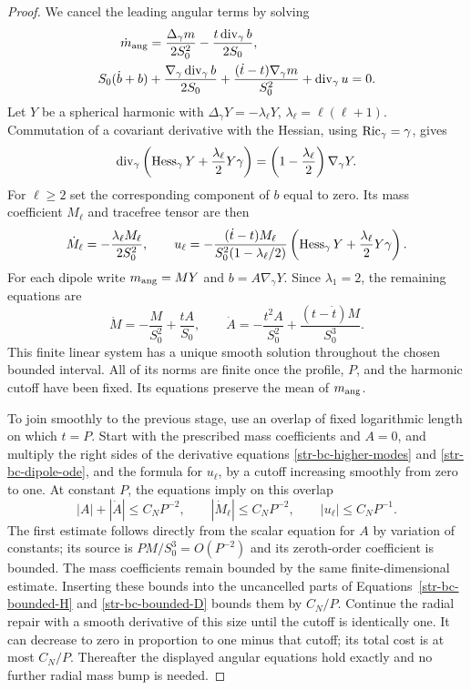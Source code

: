 \begin{proof}
We cancel the leading angular terms by solving
\begin{align}
 \dot m_{\rm ang}&=\frac{\Delta_\gamma m}{2S_0^2}
                   -\frac{t\operatorname{div}_\gamma b}{2S_0},
 \label{str-bc-angular-mass}\\
 S_0(\dot b+b)&+\frac{\nabla_\gamma\operatorname{div}_\gamma b}{2S_0}
 +\frac{(\dot t-t)\nabla_\gamma m}{S_0^2}
 +\operatorname{div}_\gamma u=0.
 \label{str-bc-angular-momentum}
\end{align}
Let $Y$ be a spherical harmonic with
$\Delta_\gamma Y=-\lambda_\ell Y$,
$\lambda_\ell=\ell(\ell+1)$. Commutation of a covariant derivative with
the Hessian, using $\operatorname{Ric}_\gamma=\gamma$, gives
\begin{equation}
 \operatorname{div}_\gamma\left(\operatorname{Hess}_\gamma Y+
                   \frac{\lambda_\ell}{2}Y\gamma\right)
       =\left(1-\frac{\lambda_\ell}{2}\right)\nabla_\gamma Y.
 \label{str-bc-tf-hessian}
\end{equation}
For $\ell\geq2$ set the corresponding component of $b$ equal to zero.
Its mass coefficient $M_\ell$ and tracefree tensor are then
\begin{equation}
 \dot M_\ell=-\frac{\lambda_\ell M_\ell}{2S_0^2},\qquad
 u_\ell=-\frac{(\dot t-t)M_\ell}
 {S_0^2(1-\lambda_\ell/2)}
 \left(\operatorname{Hess}_\gamma Y+\frac{\lambda_\ell}{2}Y\gamma\right).
 \label{str-bc-higher-modes}
\end{equation}
For each dipole write $m_{\rm ang}=MY$ and $b=A\nabla_\gamma Y$.
Since $\lambda_1=2$, the remaining equations are
\begin{equation}
 \dot M=-\frac{M}{S_0^2}+\frac{tA}{S_0},\qquad
 \dot A=-\frac{t^2A}{S_0^2}+\frac{(t-\dot t)M}{S_0^3}.
 \label{str-bc-dipole-ode}
\end{equation}
This finite linear system has a unique smooth solution throughout the
chosen bounded interval. All of its norms are finite once the profile,
$P$, and the harmonic cutoff have been fixed. Its equations preserve the
mean of $m_{\rm ang}$.

To join smoothly to the previous stage, use an overlap of fixed logarithmic
length on which $t=P$. Start with the prescribed mass coefficients and
$A=0$, and multiply the right sides of the derivative equations
\eqref{str-bc-higher-modes} and \eqref{str-bc-dipole-ode}, and the formula
for $u_\ell$, by a cutoff increasing smoothly from zero to one. At constant
$P$, the equations imply on this overlap
\[
 |A|+|\dot A|\leq C_NP^{-2},\qquad
 |\dot M_\ell|\leq C_NP^{-2},\qquad |u_\ell|\leq C_NP^{-1}.
\]
The first estimate follows directly from the scalar equation for $A$ by
variation of constants; its source is $PM/S_0^3=O(P^{-2})$ and its
zeroth-order coefficient is bounded. The mass coefficients remain bounded
by the same finite-dimensional estimate. Inserting these bounds into the
uncancelled parts of Equations~\eqref{str-bc-bounded-H} and
\eqref{str-bc-bounded-D} bounds them by $C_N/P$. Continue the radial repair
with a smooth derivative of this size until the cutoff is identically one.
It can decrease to zero in proportion to one minus that cutoff; its total
cost is at most $C_N/P$. Thereafter the displayed angular equations hold
exactly and no further radial mass bump is needed.


\end{proof}
